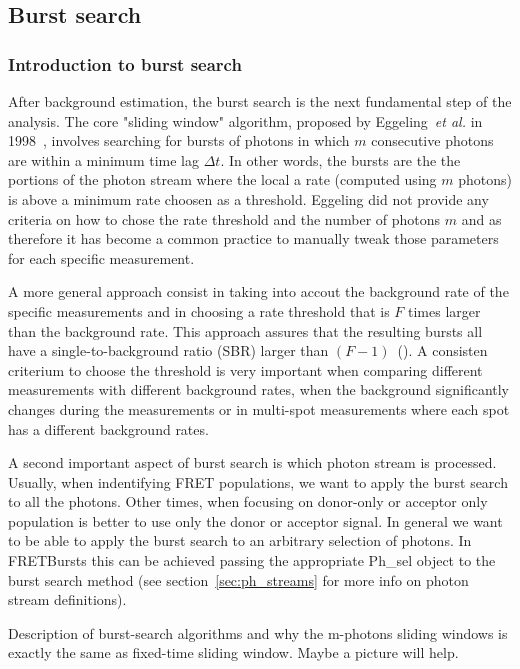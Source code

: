 \subsection{Burst search}
\label{sec:burstsearch}

\subsubsection{Introduction to burst search}
After background estimation, the burst search is the next fundamental step of the analysis. The core "sliding window" algorithm, proposed by Eggeling~\textit{et al.} in 1998~\cite{Eggeling_1998}, involves searching for bursts of photons
in which $m$ consecutive photons are within a minimum time lag $\Delta t$. In other words, the bursts are the the portions of the photon stream where the local a rate (computed using $m$ photons) is above a minimum rate choosen as a threshold. Eggeling did not provide any criteria on how to chose the rate threshold and the number of photons $m$ and as therefore it has become a common practice to manually tweak those parameters for each specific measurement. 

A more general approach consist in taking into accout the background rate of the specific measurements and in choosing a rate threshold that is $F$ times larger than the background rate. This approach assures that the resulting bursts all have a single-to-background ratio (SBR) larger than $(F-1)$~(\cite{Michalet_2012}). A consisten criterium to choose the threshold is very important when comparing different measurements with different background rates, when the background significantly changes during the measurements or in multi-spot measurements where each spot has a different background rates.

A second important aspect of burst search is which photon stream is processed. Usually, when indentifying FRET populations, we want to apply the burst search to all the photons. Other times, when focusing on donor-only or acceptor only population is better to use only the donor or acceptor signal. In general we want to be able to apply the burst search to an arbitrary selection of photons. In FRETBursts this can be achieved passing the appropriate Ph_sel object to the burst search method (see section~\ref{sec:ph_streams} for more info on photon stream definitions).

Description of burst-search algorithms and why the m-photons sliding windows is exactly the same as fixed-time sliding window. Maybe a picture will help.

